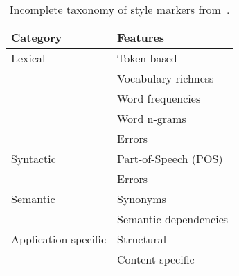 \begin{table}[h]
    \centering
    \caption[Incomplete taxonomy of style markers.]{Incomplete taxonomy of style markers from~\citep{stamatatos_survey_2009}.}
    \label{tab:stylometric_features}
 
    \begin{tabular}{@{}ll@{}} %
    \toprule
    \textbf{Category} & \textbf{Features} \\ 
    \midrule
    Lexical & Token-based \\ %
     & Vocabulary richness  \\
     & Word frequencies  \\
     & Word n-grams  \\
     & Errors \\
    Syntactic & Part-of-Speech (POS)  \\
     & Errors  \\
    Semantic & Synonyms \\
     & Semantic dependencies \\
    Application-specific & Structural  \\
     & Content-specific\\
     \bottomrule
    \end{tabular}%

\end{table}

